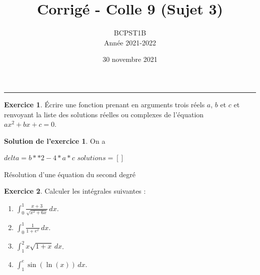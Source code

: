 \documentclass[a4paper, 11pt,openany]{article}%
\title{Corrigé - Colle 9 (Sujet 3)}
\author{BCPST1B\\
Année 2021-2022}
\date{30 novembre 2021}
\theoremstyle{plain}
\theoremstyle{definition}
\newtheorem{exo}{Exercice}
\newtheorem{sol}{Solution de l'exercice}
\theoremstyle{remark}
\begin{document}
   \maketitle
      \rule{\linewidth}{0.5mm}








\begin{exo}
Écrire une fonction prenant en arguments trois réels $a$, $b$ et $c$ et renvoyant la liste des solutions réelles ou complexes de l'équation $ax^2 + bx + c = 0$.
\end{exo}

\begin{sol}
On a
\begin{center}
\begin{algorithm}
$ delta=b**2-4*a*c$ \;
$solutions=[]$ \;
\caption{Résolution d'une équation du second degré}
\end{algorithm}
\end{center}
\end{sol}

\begin{exo}
Calculer les intégrales suivantes :
\begin{multicols}{2}
\begin{enumerate}
\item $\displaystyle{\int_0^1 \frac{x+3}{\sqrt{x^2 + 6x}} \, dx}$.
\item $\displaystyle{\int_0^1 \frac{1}{1+e^x} \, dx}$.
\item $\displaystyle{\int_1^2  x\sqrt{1+x} \, dx}$.
\item $\displaystyle{\int_1^e \sin(\ln(x)) \, dx}$.
\end{enumerate}
\end{multicols}
\end{exo}
\end{document}
